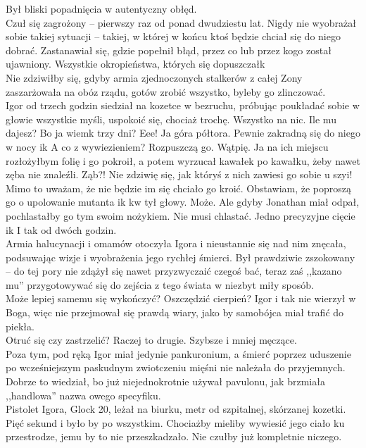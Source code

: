 \documentclass[../MAIN.tex]{subfiles}
\begin{document}
Był bliski popadnięcia w autentyczny obłęd.\\
Czuł się zagrożony -- pierwszy raz od ponad dwudziestu lat. Nigdy nie wyobrażał sobie takiej sytuacji -- takiej, w której w końcu ktoś będzie chciał się do niego dobrać.
Zastanawiał się, gdzie popełnił błąd, przez co lub przez kogo został ujawniony. Wszystkie okropieństwa, których się dopuszczał\3k\\
Nie zdziwiłby się, gdyby armia zjednoczonych stalkerów z całej Zony zaszarżowała na obóz rządu, gotów zrobić wszystko, byleby go zlinczować.\\
Igor od trzech godzin siedział na kozetce w bezruchu, próbując poukładać sobie w głowie wszystkie myśli, uspokoić się, chociaż trochę. Wszystko na nic.
\sx Ile mu dajesz?
\xx Bo ja wiem\3k trzy dni?
\xx Eee! Ja góra półtora. Pewnie zakradną się do niego w nocy i\3k
\xx A co z wywiezieniem?
\xx Rozpuszczą go.
\xx Wątpię. Ja na ich miejscu rozłożyłbym folię i go pokroił, a potem wyrzucał kawałek po kawałku, żeby nawet zęba nie znaleźli.
\xx Ząb?! Nie zdziwię się, jak któryś z nich zawiesi go sobie u szyi!
\xx Mimo to uważam, że nie będzie im się chciało go kroić. Obstawiam, że poproszą go o upolowanie mutanta i\3k
\xx \3kw tył głowy.
\xx Może. Ale gdyby Jonathan miał odpał, pochlastałby go tym swoim nożykiem.
\xx Nie musi chlastać. Jedno precyzyjne cięcie i\3k
\qd
I tak od dwóch godzin.\\
Armia halucynacji i omamów otoczyła Igora i nieustannie się nad nim znęcała, podsuwając wizje i wyobrażenia jego rychłej śmierci. Był prawdziwie zszokowany -- do tej pory nie zdążył się nawet przyzwyczaić czegoś bać, teraz zaś ,,kazano mu'' przygotowywać się do zejścia z tego świata w niezbyt miły sposób.\\
Może lepiej samemu się wykończyć? Oszczędzić cierpień? Igor i tak nie wierzył w Boga, więc nie przejmował się prawdą wiary, jako by samobójca miał trafić do piekła.\\
Otruć się czy zastrzelić? Raczej to drugie. Szybsze i mniej męczące.\\
Poza tym, pod ręką Igor miał jedynie pankuronium, a śmierć poprzez uduszenie po wcześniejszym paskudnym zwiotczeniu mięśni nie należała do przyjemnych. Dobrze to wiedział, bo już niejednokrotnie używał pavulonu, jak brzmiała ,,handlowa'' nazwa owego specyfiku.\\
Pistolet Igora, Glock 20, leżał na biurku, metr od szpitalnej, skórzanej kozetki. Pięć sekund i było by po wszystkim. Chociażby mieliby wywiesić jego ciało ku przestrodze, jemu by to nie przeszkadzało. Nie czułby już kompletnie niczego.\\
\end{document}
